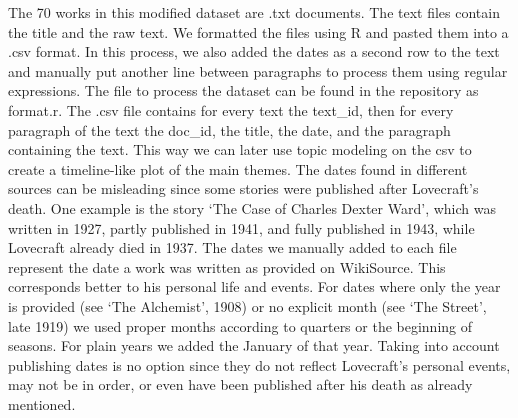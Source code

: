 The 70 works in this modified dataset are .txt documents. The text files contain the title and 
the raw text. We formatted the files using R and pasted them into a .csv format. In this process, 
we also added the dates as a second row to the text and manually put another line between 
paragraphs to process them using regular expressions. The file to process the dataset can be 
found in the repository as format.r. The .csv file contains for every text the text\_id, then 
for every paragraph of the text the doc\_id, the title, the date, and the paragraph containing 
the text. This way we can later use topic modeling on the csv to create a timeline-like plot of 
the main themes. The dates found in different sources can be misleading since some stories were 
published after Lovecraft’s death. One example is the story ‘The Case of Charles Dexter Ward’, 
which was written in 1927, partly published in 1941, and fully published in 1943, while Lovecraft 
already died in 1937. The dates we manually added to each file represent the date a work was 
written as provided on WikiSource. This corresponds better to his personal life and events. For 
dates where only the year is provided (see ‘The Alchemist’, 1908) or no explicit month 
(see ‘The Street’, late 1919) we used proper months according to quarters or the beginning of 
seasons. For plain years we added the January of that year. Taking into account publishing dates 
is no option since they do not reflect Lovecraft’s personal events, may not be in order, or even 
have been published after his death as already mentioned.